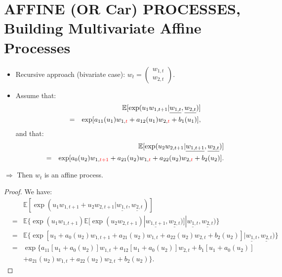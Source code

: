 \documentclass[
  12pt,
]{book}
\providecommand{\tightlist}{%
  \setlength{\itemsep}{0pt}\setlength{\parskip}{0pt}}
\theoremstyle{definition}
\theoremstyle{definition}
\theoremstyle{definition}
\theoremstyle{definition}
\theoremstyle{remark}
\begin{document}
\hypertarget{buildingmulti}{%
\section{AFFINE (OR Car) PROCESSES, Building Multivariate Affine Processes}\label{buildingmulti}}

\begin{itemize}
\tightlist
\item
  Recursive approach (bivariate case): \(w_t = \left(\begin{array}{c} w_{1,t}\\ w_{2,t} \end{array} \right)\).
\item
  Assume that:
  \begin{eqnarray*}
  &&\mathbb{E}[\exp(u_1 w_{1,t+1}|\underline{w_{1,t}}, \underline{w_{2,t}})]\\
  &=& \exp[a_{11}(u_1)w_{1,{\color{red}{t}}}+a_{12}(u_1)w_{2,{\color{red}{t}}}+b_{1}(u_1)],
  \end{eqnarray*}
  and that:
  \begin{eqnarray*}
  && \mathbb{E}[\exp(u_2 w_{2,t+1}|\underline{w_{1,t+1}}, \underline{w_{2,t}})]\\
  &= & \exp[a_0(u_2)w_{1,{\color{red}{t+1}}}+a_{21}(u_2)w_{1,{\color{red}{t}}}+a_{22}(u_2)w_{2,{\color{red}{t}}}+b_2(u_2)].
  \end{eqnarray*}
\end{itemize}

\(\Rightarrow\) Then \(w_t\) is an affine process.

\begin{proof}
We have:
\begin{eqnarray*}
&& \mathbb{E}[\exp(u_1 w_{1,t+1}+u_2 w_{2,t+1}|\underline{w_{1,t}}, \underline{w_{2,t}})]\\
&= & \mathbb{E}\{\exp(u_1 w_{1,t+1}) \mathbb{E}[\exp(u_{2}w_{2,t+1})|\underline{w_{1,t+1}}, \underline{w_{2,t}})]|\underline{w_{1,t}}, \underline{w_{2,t}})\} \\
&= & \mathbb{E}\{\exp[u_1+a_0(u_2)w_{1,t+1}+a_{21}(u_2)w_{1,t} + a_{22}(u_2)w_{2,t}+b_2(u_2)]|\underline{w_{1,t}}, \underline{w_{2,t}})\} \\
&= & \exp\{a_{11}[u_1+a_0(u_2)]w_{1,t}+a_{12}[u_1+a_0(u_2)]w_{2,t}+b_1[u_1+a_0(u_2)] \\
&&+  a_{21}(u_2)w_{1,t}+a_{22}(u_2)w_{2,t}+b_2(u_2)\}.
\end{eqnarray*}
\end{proof}
\end{document}
